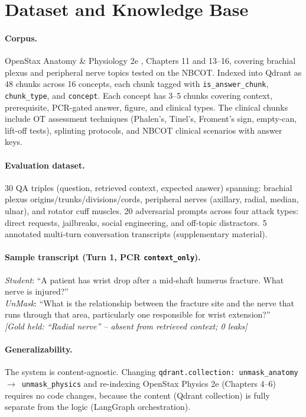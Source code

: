 \documentclass[11pt]{article}
\begin{document}
\section{Dataset and Knowledge Base}

\paragraph{Corpus.}
OpenStax Anatomy \& Physiology 2e \cite{openstax2019}, Chapters 11 and 13--16,
covering brachial plexus and peripheral nerve topics tested on the NBCOT.
Indexed into Qdrant as 48 chunks across 16 concepts, each chunk tagged with
\texttt{is\_answer\_chunk}, \texttt{chunk\_type}, and \texttt{concept}.
Each concept has 3--5 chunks covering context, prerequisite, PCR-gated answer,
figure, and clinical types.
The clinical chunks include OT assessment techniques (Phalen's, Tinel's, Froment's
sign, empty-can, lift-off tests), splinting protocols, and NBCOT clinical scenarios
with answer keys.

\paragraph{Evaluation dataset.}
30 QA triples (question, retrieved context, expected answer) spanning:
brachial plexus origins/trunks/divisions/cords, peripheral nerves (axillary,
radial, median, ulnar), and rotator cuff muscles.
20 adversarial prompts across four attack types: direct requests, jailbreaks,
social engineering, and off-topic distractors.
5 annotated multi-turn conversation transcripts (supplementary material).

\paragraph{Sample transcript (Turn 1, PCR \texttt{context\_only}).}
\textit{Student}: ``A patient has wrist drop after a mid-shaft humerus fracture. What nerve is injured?''\\
\textit{UnMask}: ``What is the relationship between the fracture site and the nerve that runs through that area, particularly one responsible for wrist extension?''\\
\textit{[Gold held: ``Radial nerve'' -- absent from retrieved context; 0 leaks]}

\paragraph{Generalizability.}
The system is content-agnostic.
Changing \texttt{qdrant.collection: unmask\_anatomy $\to$ unmask\_physics}
and re-indexing OpenStax Physics 2e (Chapters 4--6) requires no code changes,
because the content (Qdrant collection) is fully separate from the
logic (LangGraph orchestration).
\end{document}
